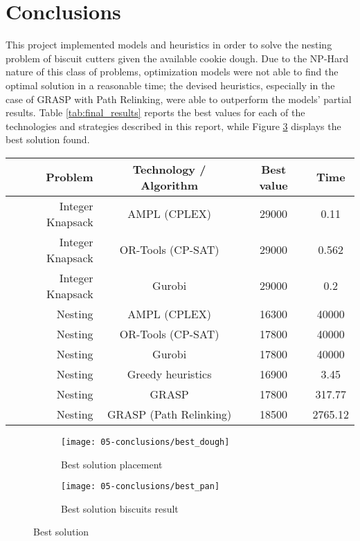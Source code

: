 
\section{Conclusions}

This project implemented models and heuristics in order to solve the nesting problem of biscuit cutters given the available cookie dough. Due to the NP-Hard nature of this class of problems, optimization models were not able to find the optimal solution in a reasonable time; the devised heuristics, especially in the case of GRASP with Path Relinking, were able to outperform the models' partial results. Table \ref{tab:final_results} reports the best values for each of the technologies and strategies described in this report, while Figure \ref{fig:best_solution} displays the best solution found.

\begin{center}
	\begin{tabular}{r|c|c|c}
		Problem				& Technology / Algorithm	& Best value	& Time		\\
		\hline
		Integer Knapsack	& AMPL (CPLEX)           	& 29000      	& 0.11		\\  
		Integer Knapsack 	& OR-Tools (CP-SAT)      	& 29000      	& 0.562 	\\  
		Integer Knapsack	& Gurobi                 	& 29000      	& 0.2   	\\
		Nesting				& AMPL (CPLEX)           	& 16300      	& 40000 	\\
		Nesting				& OR-Tools (CP-SAT)      	& 17800      	& 40000 	\\
		Nesting				& Gurobi                 	& 17800      	& 40000		\\
		Nesting				& Greedy heuristics      	& 16900      	& 3.45   	\\
		Nesting				& GRASP                  	& 17800      	& 317.77	\\
		Nesting				& GRASP (Path Relinking) 	& 18500      	& 2765.12      
	\end{tabular}
\end{center}

\begin{figure}[H]
	\begin{subfigure}[b]{.49\textwidth}
		\centering
		\texttt{[image: 05-conclusions/best\_dough]}
		\caption{Best solution placement}
		\label{fig:best_dough}
	\end{subfigure} 
	\hfill
	\begin{subfigure}[b]{.49\textwidth}
		\centering
		\texttt{[image: 05-conclusions/best\_pan]}
		\caption{Best solution biscuits result}
		\label{fig:best_pan}
	\end{subfigure}
	\caption{Best solution}
	\label{fig:best_solution}
\end{figure}
